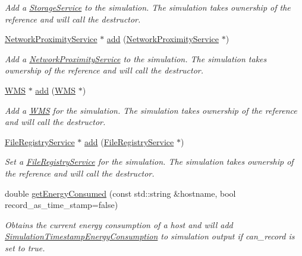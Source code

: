 \begin{DoxyCompactItemize}
\begin{DoxyCompactList}\small\item\em Add a \hyperlink{classwrench_1_1_storage_service}{Storage\+Service} to the simulation. The simulation takes ownership of the reference and will call the destructor. \end{DoxyCompactList}\item 
\hyperlink{classwrench_1_1_network_proximity_service}{Network\+Proximity\+Service} $\ast$ \hyperlink{classwrench_1_1_simulation_aabac8d768a9731d1d53fbc29c72b8f27}{add} (\hyperlink{classwrench_1_1_network_proximity_service}{Network\+Proximity\+Service} $\ast$)
\begin{DoxyCompactList}\small\item\em Add a \hyperlink{classwrench_1_1_network_proximity_service}{Network\+Proximity\+Service} to the simulation. The simulation takes ownership of the reference and will call the destructor. \end{DoxyCompactList}\item 
\hyperlink{classwrench_1_1_w_m_s}{W\+MS} $\ast$ \hyperlink{classwrench_1_1_simulation_ad79637ec3d0d4b17c9ab4b78104ef27e}{add} (\hyperlink{classwrench_1_1_w_m_s}{W\+MS} $\ast$)
\begin{DoxyCompactList}\small\item\em Add a \hyperlink{classwrench_1_1_w_m_s}{W\+MS} for the simulation. The simulation takes ownership of the reference and will call the destructor. \end{DoxyCompactList}\item 
\hyperlink{classwrench_1_1_file_registry_service}{File\+Registry\+Service} $\ast$ \hyperlink{classwrench_1_1_simulation_a18a43da399eb9d0b59c3af66c46ecd16}{add} (\hyperlink{classwrench_1_1_file_registry_service}{File\+Registry\+Service} $\ast$)
\begin{DoxyCompactList}\small\item\em Set a \hyperlink{classwrench_1_1_file_registry_service}{File\+Registry\+Service} for the simulation. The simulation takes ownership of the reference and will call the destructor. \end{DoxyCompactList}\item 
double \hyperlink{classwrench_1_1_simulation_ad5096f3b1d622eab4494eca4ae828d73}{get\+Energy\+Consumed} (const std\+::string \&hostname, bool record\+\_\+as\+\_\+time\+\_\+stamp=false)
\begin{DoxyCompactList}\small\item\em Obtains the current energy consumption of a host and will add \hyperlink{classwrench_1_1_simulation_timestamp_energy_consumption}{Simulation\+Timestamp\+Energy\+Consumption} to simulation output if can\+\_\+record is set to true. \end{DoxyCompactList}\item 

\end{DoxyCompactItemize}
